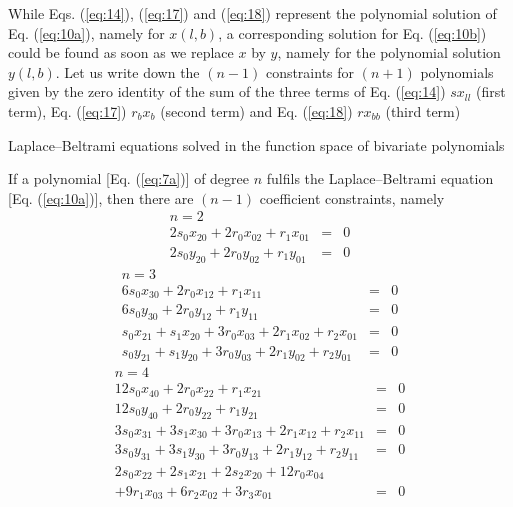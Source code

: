 \documentclass[jog]{svjour}
\begin{document}
While Eqs. (\ref{eq:14}), (\ref{eq:17}) and (\ref{eq:18}) represent the
polynomial solution of Eq. (\ref{eq:10a}), namely for $x(l,b)$, a corresponding
solution for Eq. (\ref{eq:10b}) could be found as soon as we replace $x$
by $y$, namely for the polynomial solution $y(l,b)$. Let us write down
the $(n-1)$ constraints for $(n+1)$ polynomials given by the zero
identity of the sum of the three terms of Eq. (\ref{eq:14}) $sx_{ll}$
(first term), Eq. (\ref{eq:17}) $r_bx_b$ (second term) and Eq.
(\ref{eq:18}) $rx_{bb}$ (third term)

\begin{corollary}\label{cor:1}
Laplace--Beltrami equations solved in the function space of bivariate
polynomials

If a polynomial [Eq. (\ref{eq:7a})] of degree $n$ fulfils the
Laplace--Beltrami equation [Eq. (\ref{eq:10a})], then there are $(n-1)$
coefficient constraints, namely
\begin{equation}
\begin{array}{lcr}
{n=2} & &\\
2s_0x_{20}+2r_0x_{02}+r_1x_{01} &= &0\\
2s_0y_{20}+2r_0y_{02}+r_1y_{01} &= &0
\end{array}
\label{eq:19}
\end{equation}
\begin{equation}
\begin{array}{lcr}
{n=3} & &\\
6s_0x_{30}+2r_0x_{12}+r_1x_{11} &= &0\\
6s_0y_{30}+2r_0y_{12}+r_1y_{11} &= &0\\
s_0x_{21}+s_1x_{20}+3r_0x_{03}+2r_1x_{02}+r_2x_{01} &= &0\\
s_0y_{21}+s_1y_{20}+3r_0y_{03}+2r_1y_{02}+r_2y_{01} &= &0
\end{array}
\label{eq:20}
\end{equation}
\begin{equation}
\begin{array}{lcr}
{n=4} & &\\
12s_0x_{40}+2r_0x_{22}+r_1x_{21} &= &0\\
12s_0y_{40}+2r_0y_{22}+r_1y_{21} &= &0\\
3s_0x_{31}+3s_1x_{30}+3r_0x_{13}+2r_1x_{12}+r_2x_{11} &= &0\\
3s_0y_{31}+3s_1y_{30}+3r_0y_{13}+2r_1y_{12}+r_2y_{11} &= &0\\
2s_0x_{22}+2s_1x_{21}+2s_2x_{20}+12r_0x_{04} & &\\
+9r_1x_{03}+6r_2x_{02}+3r_3x_{01} &= &0\\

\end{array}
\end{equation}
\end{corollary}
\end{document}
